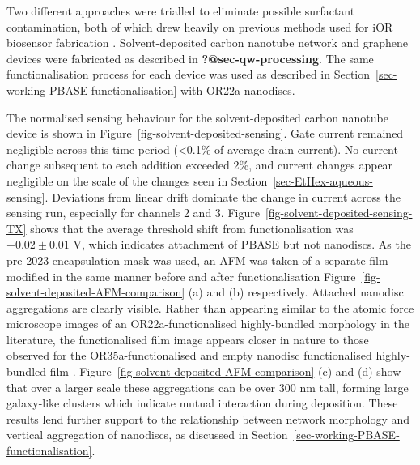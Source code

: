 \documentclass[
  a4paper,
]{scrbook}
\begin{document}
Two different approaches were trialled to eliminate possible surfactant
contamination, both of which drew heavily on previous methods used for
iOR biosensor fabrication \autocite{Murugathas2019a,Murugathas2020}.
Solvent-deposited carbon nanotube network and graphene devices were
fabricated as described in \textbf{?@sec-qw-processing}. The same
functionalisation process for each device was used as described in
Section~\ref{sec-working-PBASE-functionalisation} with OR22a nanodiscs.

The normalised sensing behaviour for the solvent-deposited carbon
nanotube device is shown in Figure~\ref{fig-solvent-deposited-sensing}.
Gate current remained negligible across this time period (\textless0.1\%
of average drain current). No current change subsequent to each addition
exceeded 2\%, and current changes appear negligible on the scale of the
changes seen in Section~\ref{sec-EtHex-aqueous-sensing}. Deviations from
linear drift dominate the change in current across the sensing run,
especially for channels 2 and 3.
Figure~\ref{fig-solvent-deposited-sensing-TX} shows that the average
threshold shift from functionalisation was \(-0.02\pm0.01\) V, which
indicates attachment of PBASE but not nanodiscs. As the pre-2023
encapsulation mask was used, an AFM was taken of a separate film
modified in the same manner before and after functionalisation
Figure~\ref{fig-solvent-deposited-AFM-comparison} (a) and (b)
respectively. Attached nanodisc aggregations are clearly visible. Rather
than appearing similar to the atomic force microscope images of an
OR22a-functionalised highly-bundled morphology in the literature, the
functionalised film image appears closer in nature to those observed for
the OR35a-functionalised and empty nanodisc functionalised
highly-bundled film \autocite{Murugathas2019a}.
Figure~\ref{fig-solvent-deposited-AFM-comparison} (c) and (d) show that
over a larger scale these aggregations can be over 300 nm tall, forming
large galaxy-like clusters which indicate mutual interaction during
deposition. These results lend further support to the relationship
between network morphology and vertical aggregation of nanodiscs, as
discussed in Section~\ref{sec-working-PBASE-functionalisation}.
\end{document}
